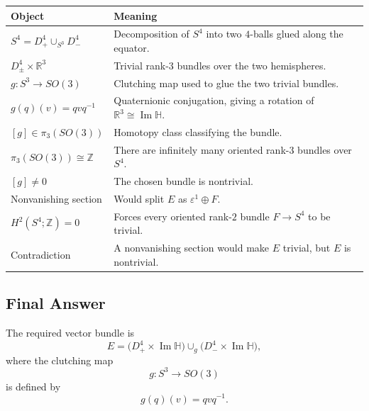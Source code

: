 \documentclass[12pt,a4paper]{article}
\theoremstyle{notespace}
\begin{document}
\begin{center}
	\renewcommand{\arraystretch}{1.35}
	\begin{tabular}{>{\raggedright\arraybackslash}p{}
			>{\raggedright\arraybackslash}p{}}
		\hline
		\textbf{Object} & \textbf{Meaning} \\
		\hline
		\(S^4=D^4_+\cup_{S^3}D^4_-\) 
		& Decomposition of \(S^4\) into two \(4\)-balls glued along the equator. \\
		
		\(D^4_\pm\times \mathbb R^3\) 
		& Trivial rank-\(3\) bundles over the two hemispheres. \\
		
		\(g:S^3\to SO(3)\) 
		& Clutching map used to glue the two trivial bundles. \\
		
		\(g(q)(v)=qvq^{-1}\) 
		& Quaternionic conjugation, giving a rotation of \(\mathbb R^3\cong\operatorname{Im}\mathbb H\). \\
		
		\([g]\in \pi_3(SO(3))\) 
		& Homotopy class classifying the bundle. \\
		
		\(\pi_3(SO(3))\cong \mathbb Z\) 
		& There are infinitely many oriented rank-\(3\) bundles over \(S^4\). \\
		
		\([g]\neq 0\) 
		& The chosen bundle is nontrivial. \\
		
		Nonvanishing section 
		& Would split \(E\) as \(\varepsilon^1\oplus F\). \\
		
		\(H^2(S^4;\mathbb Z)=0\) 
		& Forces every oriented rank-\(2\) bundle \(F\to S^4\) to be trivial. \\
		
		Contradiction 
		& A nonvanishing section would make \(E\) trivial, but \(E\) is nontrivial. \\
		\hline
	\end{tabular}
\end{center}

\subsection{Final Answer}

The required vector bundle is
\[
\boxed{
	E =
	\bigl(D^4_+ \times \operatorname{Im}\mathbb H\bigr)
	\cup_g
	\bigl(D^4_- \times \operatorname{Im}\mathbb H\bigr),
}
\]
where the clutching map
\[
g:S^3\to SO(3)
\]
is defined by
\[
\boxed{
	g(q)(v)=qvq^{-1}.
}
\]
\end{document}
